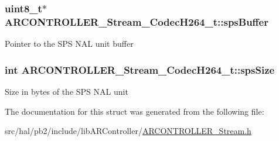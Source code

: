 \subsubsection[{\texorpdfstring{sps\+Buffer}{spsBuffer}}]{\setlength{\rightskip}{0pt plus 5cm}uint8\+\_\+t$\ast$ A\+R\+C\+O\+N\+T\+R\+O\+L\+L\+E\+R\+\_\+\+Stream\+\_\+\+Codec\+H264\+\_\+t\+::sps\+Buffer}\hypertarget{struct_a_r_c_o_n_t_r_o_l_l_e_r___stream___codec_h264__t_a2a65a8738ddaea3d18cfd99c171d1a67}{}\label{struct_a_r_c_o_n_t_r_o_l_l_e_r___stream___codec_h264__t_a2a65a8738ddaea3d18cfd99c171d1a67}
Pointer to the S\+PS N\+AL unit buffer 
\subsubsection[{\texorpdfstring{sps\+Size}{spsSize}}]{\setlength{\rightskip}{0pt plus 5cm}int A\+R\+C\+O\+N\+T\+R\+O\+L\+L\+E\+R\+\_\+\+Stream\+\_\+\+Codec\+H264\+\_\+t\+::sps\+Size}\hypertarget{struct_a_r_c_o_n_t_r_o_l_l_e_r___stream___codec_h264__t_a99b2040726d6855c20f25893659d371e}{}\label{struct_a_r_c_o_n_t_r_o_l_l_e_r___stream___codec_h264__t_a99b2040726d6855c20f25893659d371e}
Size in bytes of the S\+PS N\+AL unit 

The documentation for this struct was generated from the following file\+:\begin{DoxyCompactItemize}
\item 
src/hal/pb2/include/lib\+A\+R\+Controller/\hyperlink{_a_r_c_o_n_t_r_o_l_l_e_r___stream_8h}{A\+R\+C\+O\+N\+T\+R\+O\+L\+L\+E\+R\+\_\+\+Stream.\+h}\end{DoxyCompactItemize}
